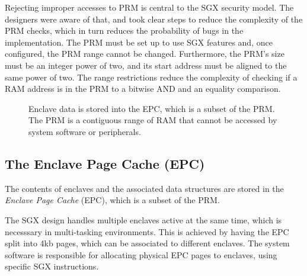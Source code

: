 Rejecting improper accesses to PRM is central to the SGX security model. The
designers were aware of that, and took clear steps to reduce the complexity of
the PRM checks, which in turn reduces the probability of bugs in the
implementation. The PRM must be set up to use SGX features and, once
configured, the PRM range cannot be changed. Furthermore, the PRM's size must
be an integer power of two, and its start address must be aligned to the same
power of two. The range restrictions reduce the complexity of checking if a RAM
address is in the PRM to a bitwise AND and an equality comparison.

\begin{figure}[hbt]
  \caption{
    Enclave data is stored into the EPC, which is a subset of the PRM. The
    PRM is a contiguous range of RAM that cannot be accessed by system software
    or peripherals.
  }
  \label{fig:sgx_epc}
\end{figure}


\subsection{The Enclave Page Cache (EPC)}


The contents of enclaves and the associated data structures are stored in the
\textit{Enclave Page Cache} (EPC), which is a subset of the PRM.

The SGX design handles multiple enclaves active at the same time, which is
necesssary in multi-tasking environments. This is achieved by having the EPC
split into 4kb pages, which can be associated to different enclaves. The system
software is responsible for allocating physical EPC pages to enclaves, using
specific SGX instructions.

